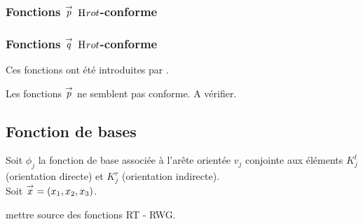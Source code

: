     \subsubsection[Fonctions p Hcurl-conforme]{Fonctions \(\vect{p}\) \(\Hrot\)-conforme}

      \begin{center}
        \begin{tikzpicture}[scale=1]
          
        \end{tikzpicture}
      \end{center}


    \subsubsection[Fonctions q Hcurl-conforme]{Fonctions \(\vect{q}\) \(\Hrot\)-conforme}

      Ces fonctions ont été introduites par \cite[eq.~28]{bendali_boundary-element_1999}.

      \begin{center}
        \begin{tikzpicture}[scale=1]
          
        \end{tikzpicture}
      \end{center}

      \begin{TODO}
        Les fonctions \(\vect{p}\) ne semblent pas conforme. A vérifier.
      \end{TODO}

    \subsection{Fonction de bases}

    Soit \(\phi_j\) la fonction de base associée à l’arête orientée \(v_j\) conjointe aux éléments  \(K_j^l\) (orientation directe) et \(K_j^r\) (orientation indirecte).\\

    Soit \(\vx = (x_1,x_2,x_3)\).

    \begin{TODO}
      mettre source des fonctions RT - RWG.
    \end{TODO}


